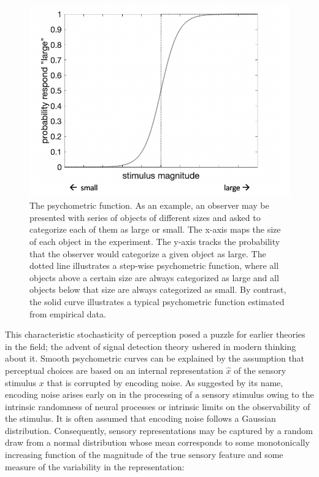 \documentclass[a4paper, nobind]{templates/ociamthesis}
\begin{document}
\begin{figure}

{\centering \includegraphics[width=0.7\linewidth]{figures/intro-psychom} 

}

\caption[Psychometric function]{The psychometric function. As an example, an observer may be presented with series of objects of different sizes and asked to categorize each of them as large or small. The x-axis maps the size of each object in the experiment. The y-axis tracks the probability that the observer would categorize a given object as large. The dotted line illustrates a step-wise psychometric function, where all objects above a certain size are always categorized as large and all objects below that size are always categorized as small. By contrast, the solid curve illustrates a typical psychometric function estimated from empirical data.}\label{fig:intro-psychom}
\end{figure}

This characteristic stochasticity of perception posed a puzzle for earlier theories in the field; the advent of signal detection theory \autocite{green1966} ushered in modern thinking about it. Smooth psychometric curves can be explained by the assumption that perceptual choices are based on an internal representation \(\hat{x}\) of the sensory stimulus \(x\) that is corrupted by encoding noise. As suggested by its name, encoding noise arises early on in the processing of a sensory stimulus owing to the intrinsic randomness of neural processes or intrinsic limits on the observability of the stimulus. It is often assumed that encoding noise follows a Gaussian distribution. Consequently, sensory representations may be captured by a random draw from a normal distribution whose mean corresponds to some monotonically increasing function of the magnitude of the true sensory feature and some measure of the variability in the representation:
\end{document}
